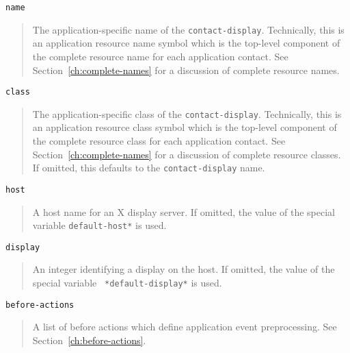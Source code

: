 \documentclass[twoside]{book}
\begin{document}
\begin{sloppy}
\begin{flushright} \parbox[t]{6.125in}{
{\tt name}
\begin{quote}
The application-specific name of the {\tt contact-display}. Technically,
this is an
application resource name symbol which is the top-level component of the
complete resource name for each application contact. See
Section~\ref{ch:complete-names} for a discussion of complete resource names.
\end{quote}

}\end{flushright}

\begin{flushright} \parbox[t]{6.125in}{
{\tt class}
\begin{quote}
The application-specific class of the {\tt contact-display}. Technically,
this is an
application resource class symbol which is the top-level component of the
complete resource class for each application contact. See
Section~\ref{ch:complete-names} for a discussion of complete resource
classes.
If omitted, this  defaults to the {\tt contact-display} name.
\end{quote}

}\end{flushright}

\begin{flushright} \parbox[t]{6.125in}{
{\tt host}
\begin{quote}
A host name for an X display server\footnotemark. If omitted, the value of the
special variable {\tt *default-host*}
is used. 
\end{quote}

}\end{flushright}

\begin{flushright} \parbox[t]{6.125in}{
{\tt display}
\begin{quote}
An integer identifying a display on the host. 
If omitted, the value of the
special variable {\tt
*default-display*} is used.
\end{quote}

}\end{flushright}


\begin{flushright} \parbox[t]{6.125in}{
{\tt before-actions}
\begin{quote}
A list of before actions which define application event
preprocessing. 
See Section~\ref{ch:before-actions}. 
\end{quote}

}
\end{flushright}
\end{sloppy}
\end{document}
